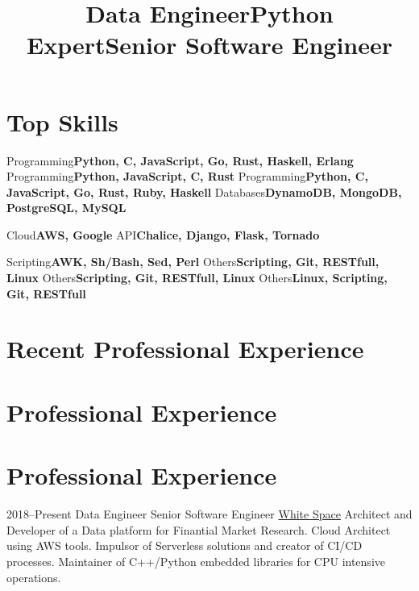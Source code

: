 \documentclass[11pt,a4paper]{moderncv}
\title{Data Engineer}                                                            %
\title{Python Expert}                                                            %
\title{Senior Software Engineer}                                                 %
\begin{document}

\maketitle


\section{Top Skills}

    \cvcomputer
        {Programming}{\textbf{Python, C, JavaScript, Go, Rust, Haskell, Erlang}} %
        {Programming}{\textbf{Python, JavaScript, C, Rust}}                      %
        {Programming}{\textbf{Python, C, JavaScript, Go, Rust, Ruby, Haskell}}   %
        {Databases}{\textbf{DynamoDB, MongoDB, PostgreSQL, MySQL}}

    \cvcomputer
        {Cloud}{\textbf{AWS, Google}}
        {API}{\textbf{Chalice, Django, Flask, Tornado}}

    \cvcomputer
        {Scripting}{\textbf{AWK, Sh/Bash, Sed, Perl}}
        {Others}{\textbf{Scripting, Git, RESTfull, Linux}}                       %
        {Others}{\textbf{Scripting, Git, RESTfull, Linux}}                       %
        {Others}{\textbf{Linux, Scripting, Git, RESTfull}}                       %


\section{Recent Professional Experience}                                         %
\section{Professional Experience}                                                %
\section{Professional Experience}                                                %

    \cventry
        {2018--Present}
        {Data Engineer}                                                          %
        {Senior Software Engineer}                                               %
        {\href{https://www.white.space}{White Space}} {} {}
        {
            Architect and Developer of a Data platform for Finantial
                Market Research.
            Cloud Architect using AWS tools.
            Impulsor of Serverless solutions and creator of CI/CD                %
                processes.                                                       %
            Maintainer of C++/Python embedded libraries for CPU
                intensive operations.
        }
\end{document}
